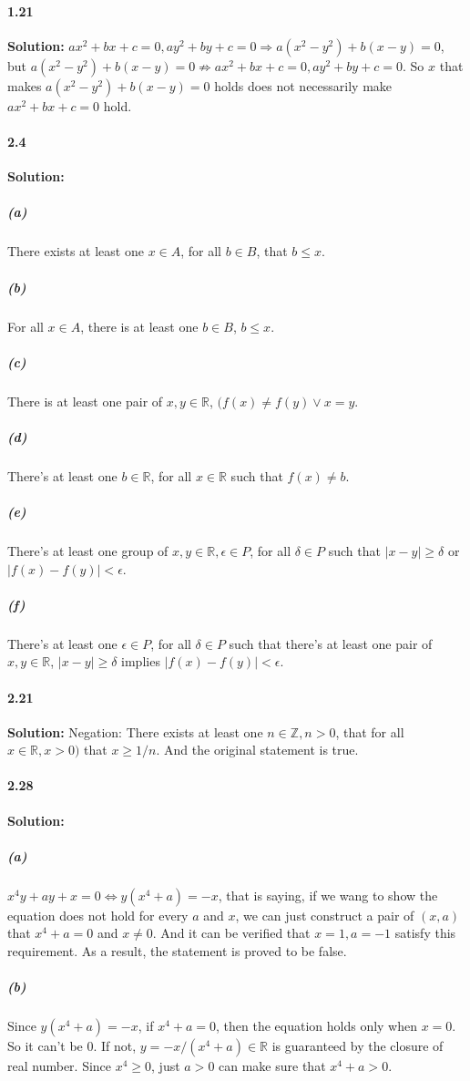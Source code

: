 \documentclass[11pt]{article}
\begin{document}
\paragraph{1.21}\textbf{Solution: }$ax^2 + bx + c = 0, ay^2 + by + c = 0 \Rightarrow a(x^2 - y^2) + b(x - y) = 0$, but $a(x^2 - y^2) + b(x - y) = 0 \nRightarrow ax^2 + bx + c = 0, ay^2 + by + c = 0$. So $x$ that makes $a(x^2 - y^2) + b(x - y) = 0$ holds does not necessarily make $ax^2 + bx + c = 0$ hold.
\paragraph{2.4}\textbf{Solution:}
    \subparagraph{(a)} There exists at least one $x \in A$, for all $b \in B$, that $b \leq x$.
    \subparagraph{(b)}For all $x \in A$, there is at least one $b \in B$, $b \leq x$.
    \subparagraph{(c)}There is at least one pair of $x, y \in \mathbb{R}$, $(f(x) \neq f(y) \vee x = y$.
    \subparagraph{(d)} There's at least one $b \in \mathbb{R}$, for all $x \in \mathbb{R}$ such that $f(x) \neq b$.
    \subparagraph{(e)} There's at least one group of $x, y \in \mathbb{R}, \epsilon \in P$, for all $\delta \in P$ such that $|x - y| \geq \delta$ or $|f(x) - f(y)| < \epsilon$.
    \subparagraph{(f)} There's at least one $\epsilon \in P$, for all $\delta \in P$ such that there's at least one pair of $x, y \in \mathbb{R}$, $|x - y| \geq \delta$ implies $|f(x) - f(y)| < \epsilon$.
\paragraph{2.21}\textbf{Solution:} Negation: There exists at least one $n \in \mathbb{Z}, n > 0$, that for all $x \in \mathbb{R}, x > 0)$ that $x \geq 1/n$. And the original statement is true.
\paragraph{2.28}\textbf{Solution:}
    \subparagraph{(a)} $x^4y + ay + x = 0 \Leftrightarrow y(x^4 + a) = -x$, that is saying, if we wang to show the equation does not hold for every $a$ and $x$, we can just construct a pair of $(x, a)$ that $x^4 + a = 0$ and $x \neq 0$. And it can be verified that $x = 1, a = -1$ satisfy this requirement. As a result, the statement is proved to be false.
    \subparagraph{(b)} Since $y(x^4 + a) = -x$, if $x^4 + a = 0$, then the equation holds only when $x = 0$. So it can't be $0$. If not, $y = -x/(x^4 + a) \in \mathbb{R}$ is guaranteed by the closure of real number. Since $x^4 \geq 0$, just $a > 0$ can make sure that $x^4 + a > 0$.
    
\end{document}
